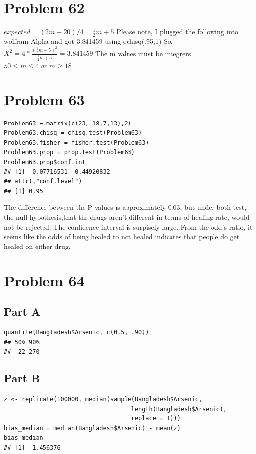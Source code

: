 \documentclass{article}\usepackage[]{graphicx}\usepackage[]{color}
\makeatletter
\newenvironment{kframe}{%
 \def\at@end@of@kframe{}%
 \ifinner\ifhmode%
  \def\at@end@of@kframe{\end{minipage}}%
  \begin{minipage}{\columnwidth}%
 \fi\fi%
 \def\FrameCommand##1{\hskip\@totalleftmargin \hskip-\fboxsep
 \colorbox{shadecolor}{##1}\hskip-\fboxsep
     \hskip-\linewidth \hskip-\@totalleftmargin \hskip\columnwidth}%
 \MakeFramed {\advance\hsize-\width
   \@totalleftmargin\z@ \linewidth\hsize
   \@setminipage}}%
 {\par\unskip\endMakeFramed%
 \at@end@of@kframe}
\newenvironment{knitrout}{}{} %
\makeatother
\begin{document}
\section*{Problem 62}
$expected = (2m+20)/4=\frac{1}{2}m+5$
Please note, I plugged the following into wolfram Alpha and got 3.841459 using qchisq(.95,1)
So, $X^{2}=4*\frac{(\frac{1}{2}m-5)^{2}}{\frac{1}{2}m+5}=3.841459$ The m values must be integrers $\therefore 0\leq m\leq 4\;or\;m \geq 18$
 
\section*{Problem 63}
\begin{knitrout}
\color{fgcolor}\begin{kframe}
\begin{verbatim}
Problem63 = matrix(c(23, 18,7,13),2)
Problem63.chisq = chisq.test(Problem63)
Problem63.fisher = fisher.test(Problem63)
Problem63.prop = prop.test(Problem63)
Problem63.prop$conf.int
## [1] -0.07716531  0.44920832
## attr(,"conf.level")
## [1] 0.95
\end{verbatim}
\end{kframe}
\end{knitrout}
The difference between the P-values is approximately 0.03, but under both test, the null hypothesis,that the drugs aren't different in terms of healing rate, would not be rejected. The confidence interval is surpisely large. From the odd's ratio, it seems like the odds of being healed to not healed indicates that people do get healed on either drug.
\section*{Problem 64}
\subsection*{Part A}
\begin{knitrout}
\color{fgcolor}\begin{kframe}
\begin{verbatim}
quantile(Bangladesh$Arsenic, c(0.5, .90))
## 50% 90% 
##  22 270
\end{verbatim}
\end{kframe}
\end{knitrout}
\subsection*{Part B}
\begin{knitrout}
\color{fgcolor}\begin{kframe}
\begin{verbatim}
z <- replicate(100000, median(sample(Bangladesh$Arsenic,
                                    length(Bangladesh$Arsenic), 
                                    replace = T)))
bias_median = median(Bangladesh$Arsenic) - mean(z)
bias_median
## [1] -1.456376
\end{verbatim}
\end{kframe}
\end{knitrout}
\end{document}
